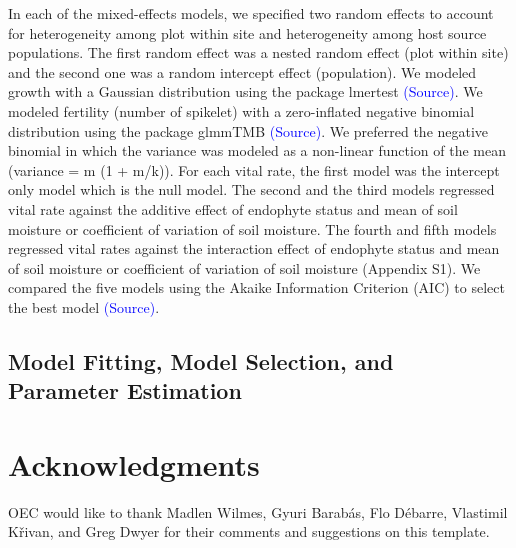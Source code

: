 \documentclass[11pt]{article}
\begin{document}
In each of the mixed-effects models, we specified two random effects to account for heterogeneity among plot within site and heterogeneity among host source populations. The first random effect was a nested random effect (plot within site) and the second one was a random intercept effect (population). We modeled growth with a Gaussian distribution using the package lmertest  \textcolor{blue}{(Source)}. We modeled fertility (number of spikelet) with a zero-inflated negative binomial distribution using the package glmmTMB  \textcolor{blue}{(Source)}. We preferred the negative binomial in which the variance was modeled as a non-linear function of the mean (variance = m (1 + m/k)). For each vital rate, the first model was the intercept only model which is the null model. The second and the third models regressed vital rate against the additive effect of endophyte status and mean of soil moisture or coefficient of variation of soil moisture. The fourth and fifth models regressed vital rates against the interaction effect of endophyte status and mean of soil moisture or coefficient of variation of soil moisture (Appendix S1). We compared the five models using the Akaike Information Criterion (AIC) to select the best model \textcolor{blue}{(Source)}. 

\subsection*{Model Fitting, Model Selection, and Parameter Estimation}


\section*{Acknowledgments}

OEC would like to thank Madlen Wilmes, Gyuri Barab\'{a}s, Flo D\'{e}barre, Vlastimil K\v{r}ivan, and Greg Dwyer for their comments and suggestions on this template.

\end{document}
